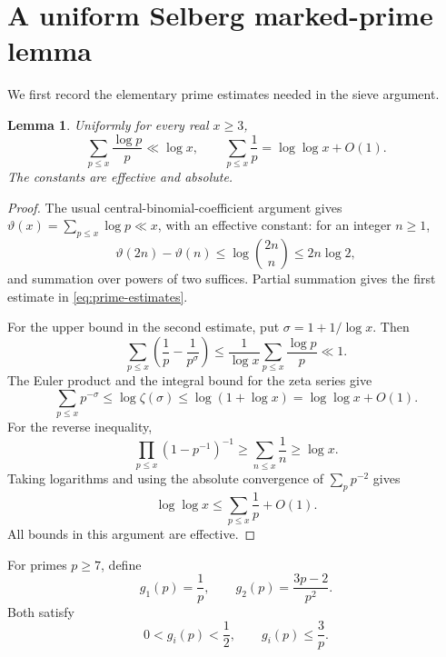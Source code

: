 \documentclass[11pt]{article}
\newtheorem{lemma}[theorem]{Lemma}
\theoremstyle{definition}
\theoremstyle{remark}
\numberwithin{equation}{section}
\begin{document}
\section{A uniform Selberg marked-prime lemma}

We first record the elementary prime estimates needed in the sieve
argument.

\begin{lemma}\label{lem:prime-estimates}
Uniformly for every real \(x\ge3\),
\begin{equation}\label{eq:prime-estimates}
 \sum_{p\le x}\frac{\log p}{p}\ll\log x,
 \qquad
 \sum_{p\le x}\frac1p=\log\log x+O(1).
\end{equation}
The constants are effective and absolute.
\end{lemma}

\begin{proof}
The usual central-binomial-coefficient argument gives
\(\vartheta(x)=\sum_{p\le x}\log p\ll x\), with an effective
constant: for an integer \(n\ge1\),
\[
 \vartheta(2n)-\vartheta(n)
 \le \log\binom{2n}{n}\le 2n\log2,
\]
and summation over powers of two suffices. Partial summation gives
the first estimate in \eqref{eq:prime-estimates}.

For the upper bound in the second estimate, put
\(\sigma=1+1/\log x\). Then
\[
 \sum_{p\le x}\left(\frac1p-\frac1{p^\sigma}\right)
 \le \frac1{\log x}\sum_{p\le x}\frac{\log p}{p}\ll1.
\]
The Euler product and the integral bound for the zeta series give
\[
 \sum_{p\le x}p^{-\sigma}
 \le\log\zeta(\sigma)
 \le\log(1+\log x)=\log\log x+O(1).
\]
For the reverse inequality,
\[
 \prod_{p\le x}(1-p^{-1})^{-1}
 \ge \sum_{n\le x}\frac1n\ge\log x.
\]
Taking logarithms and using the absolute convergence of
\(\sum_p p^{-2}\) gives
\[
 \log\log x\le\sum_{p\le x}\frac1p+O(1).
\]
All bounds in this argument are effective.
\end{proof}

For primes \(p\ge7\), define
\[
 g_1(p)=\frac1p,\qquad
 g_2(p)=\frac{3p-2}{p^2}.
\]
Both satisfy
\begin{equation}\label{eq:g-bounds}
 0<g_i(p)<\frac12,\qquad g_i(p)\le\frac3p.
\end{equation}
\end{document}
